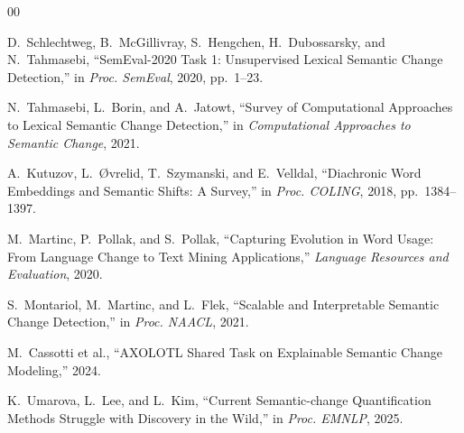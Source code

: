 \documentclass[journal]{IEEEtran}
\begin{document}
\begin{thebibliography}{00}

D.~Schlechtweg, B.~McGillivray, S.~Hengchen, H.~Dubossarsky, and N.~Tahmasebi,
``SemEval-2020 Task 1: Unsupervised Lexical Semantic Change Detection,''
in \emph{Proc. SemEval}, 2020, pp.~1--23.

N.~Tahmasebi, L.~Borin, and A.~Jatowt,
``Survey of Computational Approaches to Lexical Semantic Change Detection,''
in \emph{Computational Approaches to Semantic Change}, 2021.

A.~Kutuzov, L.~{\O}vrelid, T.~Szymanski, and E.~Velldal,
``Diachronic Word Embeddings and Semantic Shifts: A Survey,''
in \emph{Proc. COLING}, 2018, pp.~1384--1397.

M.~Martinc, P.~Pollak, and S.~Pollak,
``Capturing Evolution in Word Usage: From Language Change to Text Mining Applications,''
\emph{Language Resources and Evaluation}, 2020.

S.~Montariol, M.~Martinc, and L.~Flek,
``Scalable and Interpretable Semantic Change Detection,''
in \emph{Proc. NAACL}, 2021.

M.~Cassotti et al.,
``AXOLOTL Shared Task on Explainable Semantic Change Modeling,''
2024.

K.~Umarova, L.~Lee, and L.~Kim,
``Current Semantic-change Quantification Methods Struggle with Discovery in the Wild,''
in \emph{Proc. EMNLP}, 2025.

\end{thebibliography}
\end{document}

